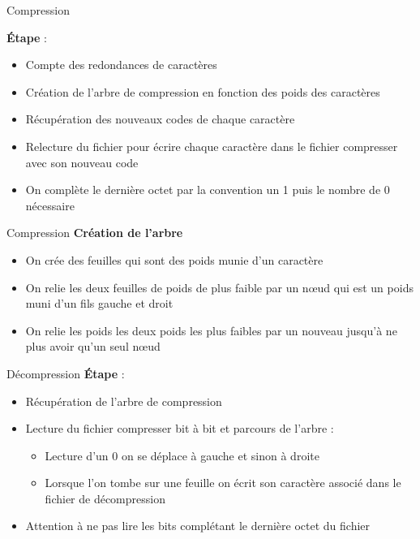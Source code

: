 \documentclass[french]{beamer}
\begin{document}
\begin{frame}{Compression}

	\textbf{Étape} :\\
	
\begin{itemize}
	\item<2-6> Compte des redondances de caractères
	\item<3-6> Création de l'arbre de compression en fonction des poids des caractères 
		
	\item<4-6> Récupération des nouveaux codes de chaque caractère
	\item<5-6> Relecture du fichier pour écrire chaque caractère dans le fichier compresser avec son nouveau code
	\item<6> On complète le dernière octet par la convention un 1 puis le nombre de 0 nécessaire
	\end{itemize}

\end{frame}
\begin{frame}{Compression}
	\textbf{Création de l'arbre}	\\
	\begin{itemize}
			\item<1-3> On crée des feuilles qui sont des poids munie d'un caractère
			\item<2-3> On relie les deux feuilles de poids de plus faible par un nœud qui est un poids muni d'un fils gauche et droit
			\item<3> On relie les poids les deux poids les plus faibles par un nouveau  jusqu'à ne plus avoir qu'un seul nœud
		\end{itemize}
\end{frame}
\begin{frame}{Décompression}
\textbf{Étape} :\\
\begin{itemize}
\item<1-5> Récupération de l'arbre de compression
\item<2-5> Lecture du fichier compresser bit à bit et parcours de l'arbre :
	\begin{itemize}
		\item<3-5> Lecture d'un 0 on se déplace à gauche et sinon à droite
		\item<4-5> Lorsque l'on tombe sur une feuille on écrit son caractère associé dans le fichier de décompression
	\end{itemize}
\item<5> Attention à ne pas lire les bits complétant le dernière octet du fichier
\end{itemize}
\end{frame}
\end{document}

